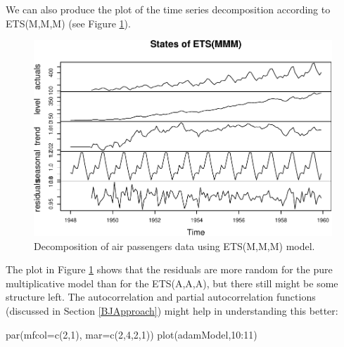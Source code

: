 \documentclass[
]{book}
\newenvironment{Shaded}{\begin{snugshade}}{\end{snugshade}}
\newcommand{\AttributeTok}[1]{\textcolor[rgb]{0.77,0.63,0.00}{#1}}
\newcommand{\DecValTok}[1]{\textcolor[rgb]{0.00,0.00,0.81}{#1}}
\newcommand{\FunctionTok}[1]{\textcolor[rgb]{0.00,0.00,0.00}{#1}}
\newcommand{\NormalTok}[1]{#1}
\newcommand{\SpecialCharTok}[1]{\textcolor[rgb]{0.00,0.00,0.00}{#1}}
\theoremstyle{definition}
\theoremstyle{definition}
\theoremstyle{definition}
\theoremstyle{definition}
\theoremstyle{remark}
\begin{document}
We can also produce the plot of the time series decomposition according to ETS(M,M,M) (see Figure \ref{fig:AirPassengersMMMDecomposition}).

\begin{figure}
\centering
\includegraphics{Svetunkov--2022----ADAM_files/figure-latex/AirPassengersMMMDecomposition-1.pdf}
\caption{\label{fig:AirPassengersMMMDecomposition}Decomposition of air passengers data using ETS(M,M,M) model.}
\end{figure}

The plot in Figure \ref{fig:AirPassengersMMMDecomposition} shows that the residuals are more random for the pure multiplicative model than for the ETS(A,A,A), but there still might be some structure left. The autocorrelation and partial autocorrelation functions (discussed in Section \ref{BJApproach}) might help in understanding this better:

\begin{Shaded}
\begin{Highlighting}[]
\FunctionTok{par}\NormalTok{(}\AttributeTok{mfcol=}\FunctionTok{c}\NormalTok{(}\DecValTok{2}\NormalTok{,}\DecValTok{1}\NormalTok{), }\AttributeTok{mar=}\FunctionTok{c}\NormalTok{(}\DecValTok{2}\NormalTok{,}\DecValTok{4}\NormalTok{,}\DecValTok{2}\NormalTok{,}\DecValTok{1}\NormalTok{))}
\FunctionTok{plot}\NormalTok{(adamModel,}\DecValTok{10}\SpecialCharTok{:}\DecValTok{11}\NormalTok{)}
\end{Highlighting}
\end{Shaded}
\end{document}
